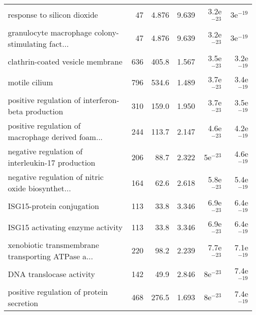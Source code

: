 \begin{longtable}{lrrrrr}
                       response to silicon dioxide &                      47 &                   4.876 &      9.639 &         3.2e$^{-23}$ &           3e$^{-19}$ \\
 granulocyte macrophage colony-stimulating fact... &                      47 &                   4.876 &      9.639 &         3.2e$^{-23}$ &           3e$^{-19}$ \\
                  clathrin-coated vesicle membrane &                     636 &                   405.8 &      1.567 &         3.5e$^{-23}$ &         3.2e$^{-19}$ \\
                                     motile cilium &                     796 &                   534.6 &      1.489 &         3.7e$^{-23}$ &         3.4e$^{-19}$ \\
 positive regulation of interferon-beta production &                     310 &                   159.0 &      1.950 &         3.7e$^{-23}$ &         3.5e$^{-19}$ \\
 positive regulation of macrophage derived foam... &                     244 &                   113.7 &      2.147 &         4.6e$^{-23}$ &         4.2e$^{-19}$ \\
  negative regulation of interleukin-17 production &                     206 &                    88.7 &      2.322 &           5e$^{-23}$ &         4.6e$^{-19}$ \\
 negative regulation of nitric oxide biosynthet... &                     164 &                    62.6 &      2.618 &         5.8e$^{-23}$ &         5.4e$^{-19}$ \\
                         ISG15-protein conjugation &                     113 &                    33.8 &      3.346 &         6.9e$^{-23}$ &         6.4e$^{-19}$ \\
                  ISG15 activating enzyme activity &                     113 &                    33.8 &      3.346 &         6.9e$^{-23}$ &         6.4e$^{-19}$ \\
 xenobiotic transmembrane transporting ATPase a... &                     220 &                    98.2 &      2.239 &         7.7e$^{-23}$ &         7.1e$^{-19}$ \\
                          DNA translocase activity &                     142 &                    49.9 &      2.846 &           8e$^{-23}$ &         7.4e$^{-19}$ \\
          positive regulation of protein secretion &                     468 &                   276.5 &      1.693 &           8e$^{-23}$ &         7.4e$^{-19}$ \\

\end{longtable}

